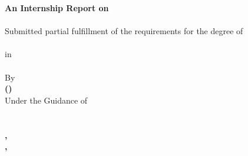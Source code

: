 \begin{titlepage}
\thispagestyle{empty}
\ChristHeader
\vspace*{1.5cm}
\begin{center}
  {\large \bfseries An Internship Report on}\\[1.2cm]
  {\Large \bfseries \InternshipTitle}\\[1 cm]

  {\normalsize Submitted partial fulfillment of the requirements for the degree of}\\[1.0 cm]
  {\Large \bfseries \MakeUppercase{\DegreeName}}\\[3pt]
  {\normalsize in}\\[3pt]
  {\normalsize \bfseries \SpecializationName}\\[1.0cm]

  {\normalsize By}\\[6pt]
  {\normalsize \bfseries \StudentName \hspace{0.3cm}(\StudentRegNo)}\\[2.0cm]

  {\normalsize Under the Guidance of}\\[6pt]
  {\normalsize \bfseries \GuideName}\\[2.0cm]

  {\normalsize \bfseries \DepartmentName}\\[2pt]
  {\normalsize \bfseries \SchoolName,}\\[2pt]
  {\normalsize \bfseries \UniversityName,\\ \CampusAddress}\\[10pt]

  {\normalsize \bfseries \CoverMonthYear}
\end{center}
\end{titlepage}
